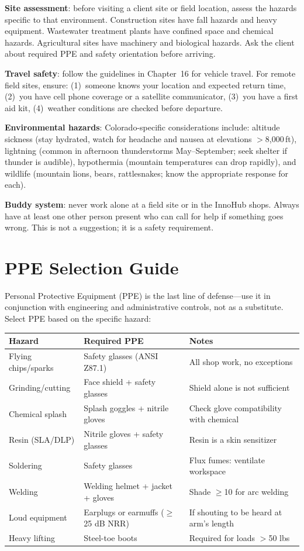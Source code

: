 \textbf{Site assessment}: before visiting a client site or field location, assess the hazards specific to that environment. Construction sites have fall hazards and heavy equipment. Wastewater treatment plants have confined space and chemical hazards. Agricultural sites have machinery and biological hazards. Ask the client about required PPE and safety orientation before arriving.

\textbf{Travel safety}: follow the guidelines in Chapter~16 for vehicle travel. For remote field sites, ensure: (1)~someone knows your location and expected return time, (2)~you have cell phone coverage or a satellite communicator, (3)~you have a first aid kit, (4)~weather conditions are checked before departure.

\textbf{Environmental hazards}: Colorado-specific considerations include: altitude sickness (stay hydrated, watch for headache and nausea at elevations $>$8,000\,ft), lightning (common in afternoon thunderstorms May--September; seek shelter if thunder is audible), hypothermia (mountain temperatures can drop rapidly), and wildlife (mountain lions, bears, rattlesnakes; know the appropriate response for each).

\textbf{Buddy system}: never work alone at a field site or in the InnoHub shops. Always have at least one other person present who can call for help if something goes wrong. This is not a suggestion; it is a safety requirement.



\section{PPE Selection Guide}
Personal Protective Equipment (PPE) is the last line of defense---use it in conjunction with engineering and administrative controls, not as a substitute. Select PPE based on the specific hazard:

\begin{center}\small
\begin{tabularx}{\textwidth}{lXX}
\toprule
\textbf{Hazard} & \textbf{Required PPE} & \textbf{Notes} \\
\midrule
Flying chips/sparks & Safety glasses (ANSI Z87.1) & All shop work, no exceptions \\
Grinding/cutting & Face shield + safety glasses & Shield alone is not sufficient \\
Chemical splash & Splash goggles + nitrile gloves & Check glove compatibility with chemical \\
Resin (SLA/DLP) & Nitrile gloves + safety glasses & Resin is a skin sensitizer \\
Soldering & Safety glasses & Flux fumes: ventilate workspace \\
Welding & Welding helmet + jacket + gloves & Shade $\geq$10 for arc welding \\
Loud equipment & Earplugs or earmuffs ($\geq$25 dB NRR) & If shouting to be heard at arm's length \\
Heavy lifting & Steel-toe boots & Required for loads $>$50 lbs \\
\bottomrule
\end{tabularx}
\end{center}


